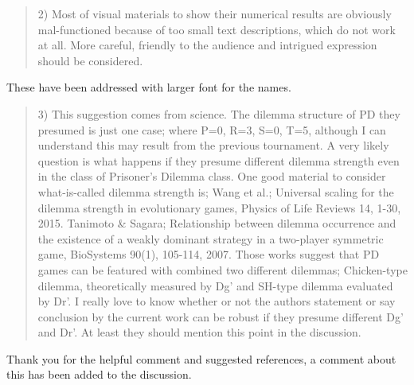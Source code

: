 \documentclass[a4]{article}
\begin{document}
\begin{quote}
2) Most of visual materials to show their numerical results are obviously mal-functioned because of too small text descriptions, which do not work at all. More careful, friendly to the audience and intrigued expression should be considered.
\end{quote}

These have been addressed with larger font for the names.

\begin{quote}
3) This suggestion comes from science. The dilemma structure of PD they presumed is just one case; where P=0, R=3, S=0, T=5, although I can understand this may result from the previous tournament. A very likely question is what happens if they presume different dilemma strength even in the class of Prisoner’s Dilemma class. One good material to consider what-is-called dilemma strength is;
Wang et al.; Universal scaling for the dilemma strength in evolutionary games, Physics of Life Reviews 14, 1-30, 2015.
Tanimoto \& Sagara; Relationship between dilemma occurrence and the existence of a weakly dominant strategy in a two-player symmetric game, BioSystems 90(1), 105-114, 2007.
Those works suggest that PD games can be featured with combined two different dilemmas; Chicken-type dilemma, theoretically measured by Dg’ and SH-type dilemma evaluated by Dr’. I really love to know whether or not the authors statement or say conclusion by the current work can be robust if they presume different Dg’ and Dr’. At least they should mention this point in the discussion.
\end{quote}

Thank you for the helpful comment and suggested references, a comment about this
has been added to the discussion.
\end{document}
